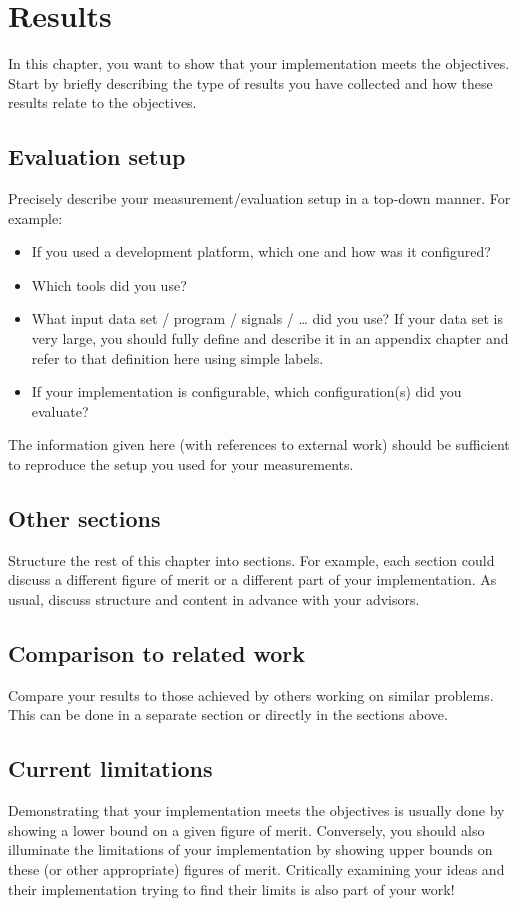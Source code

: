 \chapter{Results}
\label{ch:results}

{\color{red}
	In this chapter, you want to show that your implementation meets the objectives.
	Start by briefly describing the type of results you have collected and how these results relate to the objectives.

	\section{Evaluation setup}

	Precisely describe your measurement/evaluation setup in a top-down manner.
	For example:
	\begin{itemize}
		\item If you used a development platform, which one and how was it configured?
		\item Which tools did you use?
		\item What input data set / program / signals / \ldots{} did you use?
		      If your data set is very large, you should fully define and describe it in an appendix chapter and refer to that definition here using simple labels.
		\item If your implementation is configurable, which configuration(s) did you evaluate?
	\end{itemize}

	The information given here (with references to external work) should be sufficient to reproduce the setup you used for your measurements.

	\section{Other sections}

	Structure the rest of this chapter into sections.
	For example, each section could discuss a different figure of merit or a different part of your implementation.
	As usual, discuss structure and content in advance with your advisors.

	\section{Comparison to related work}

	Compare your results to those achieved by others working on similar problems.
	This can be done in a separate section or directly in the sections above.

	\section{Current limitations}

	Demonstrating that your implementation meets the objectives is usually done by showing a lower bound on a given figure of merit.
	Conversely, you should also illuminate the limitations of your implementation by showing upper bounds on these (or other appropriate) figures of merit.
	Critically examining your ideas and their implementation trying to find their limits is also part of your work!
}

